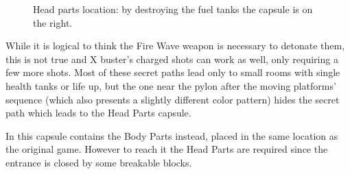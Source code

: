 \begin{figure}[htp]
\begin{subfigure}{0.4\linewidth}
		\caption{}
	\end{subfigure}
	\caption{Head parts location: by destroying the fuel tanks the capsule is on the right.}
\end{figure}While it is logical to think the Fire Wave weapon is necessary to detonate them, this is not true and X buster's charged shots can work as well, only requiring a few more shots. Most of these secret paths lead only to small rooms with single health tanks or life up, but the one near the pylon after the moving platforms' sequence (which also presents a slightly different color pattern) hides the  secret path which leads to the Head Parts capsule. 

In \mhx this capsule contains the Body Parts instead, placed in the same location as the original game. However to reach it the Head Parts are required since the entrance is closed by some breakable blocks.

